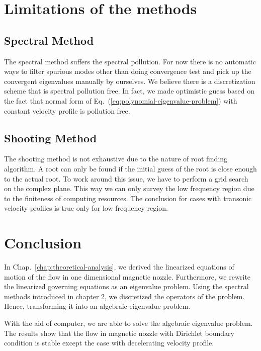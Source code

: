 \section{Limitations of the methods}
\subsection{Spectral Method}
The spectral method suffers the spectral pollution. For now there is no automatic ways to filter spurious modes other than doing convergence test and pick up the convergent eigenvalues manually by ourselves. We believe there is a discretization scheme that is spectral pollution free. In fact, we made optimistic guess based on the fact that normal form of Eq.~(\ref{eq:polynomial-eigenvalue-problem}) with constant velocity profile is pollution free.

\subsection{Shooting Method}
The shooting method is not exhaustive due to the nature of root finding algorithm. A root can only be found if the initial guess of the root is close enough to the actual root. To work around this issue, we have to perform a grid search on the complex plane. This way we can only survey the low frequency region due to the finiteness of computing resources. The conclusion for cases with transonic velocity profiles is true only for low frequency region.

\section{Conclusion}
In Chap.~\ref{chap:theoretical-analysis}, we derived the linearized equations of motion of the flow in one dimensional magnetic nozzle. Furthermore, we rewrite the linearized governing equations as an eigenvalue problem. Using the spectral methods introduced in chapter 2, we discretized the operators of the problem. Hence, transforming it into an algebraic eigenvalue problem.

With the aid of computer, we are able to solve the algebraic eigenvalue problem. The results show that the flow in magnetic nozzle with Dirichlet boundary condition is stable except the case with decelerating velocity profile.
